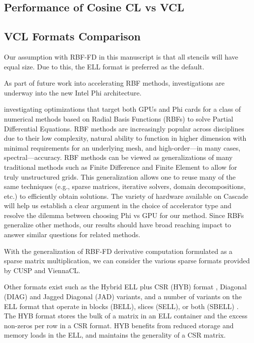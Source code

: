 \documentclass{report}
\begin{document}
\subsection{Performance of Cosine CL vs VCL}
\subsection{VCL Formats Comparison}

Our assumption with RBF-FD in this manuscript is that all stencils will have equal size. Due to this, the ELL format is preferred as the default. 
 



As part of future work into accelerating RBF methods, investigations are underway into the new Intel Phi architecture. 

 investigating optimizations that target both GPUs and Phi cards for a class of numerical methods based on Radial Basis Functions (RBFs) to solve Partial Differential Equations. RBF methods are increasingly popular across disciplines due to their low complexity, natural ability to function in higher dimension with minimal requirements for an underlying mesh, and high-order---in many cases, spectral---accuracy. RBF methods can be viewed as generalizations of many traditional methods such as Finite Difference and Finite Element to allow for truly unstructured grids. This generalization allows one to reuse many of the same techniques (e.g., sparse matrices, iterative solvers, domain decompositions, etc.) to efficiently obtain solutions. The variety of hardware available on Cascade will help us establish a clear argument in the choice of accelerator type and resolve the dilemma between choosing Phi vs GPU for our method. Since RBFs generalize other methods, our results should have broad reaching impact to answer similar questions for related methods.



With the generalization of RBF-FD derivative computation formulated as a sparse matrix multiplication, we can 
consider the various sparse formats provided by CUSP and ViennaCL. 



Other formats exist such as the Hybrid ELL plus CSR (HYB) format \cite{Bell2009}, Diagonal (DIAG) and Jagged Diagonal (JAD) variants, and a number of variants on the ELL format that operate in blocks (BELL), slices (SELL), or both (SBELL) \cite{SuKeutzer2012}. The HYB format stores the bulk of a matrix in an ELL container and the excess non-zeros per row in a CSR format. HYB benefits from reduced storage and memory loads in the ELL, and maintains the generality of a CSR matrix. 
\end{document}
